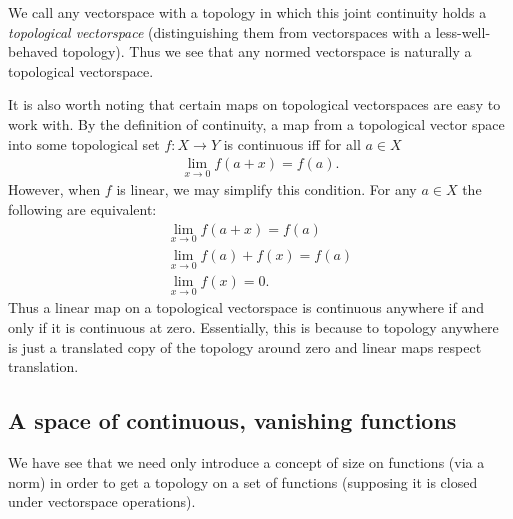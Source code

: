       We call any vectorspace with a topology in which this joint continuity holds a \emph{topological vectorspace} (distinguishing them from vectorspaces with a less-well-behaved topology).
      Thus we see that any normed vectorspace is naturally a topological vectorspace.

      It is also worth noting that certain maps on topological vectorspaces are easy to work with.
      By the definition of continuity, a map from a topological vector space into some topological set $f:X\rightarrow Y$ is continuous iff for all $a\in X$
      \begin{align*}
        \lim_{x\rightarrow 0} f(a+x) = f(a) \text{.}
      \end{align*}
      However, when $f$ is linear, we may simplify this condition.
      For any $a\in X$ the following are equivalent:
      \begin{gather*}
        \lim_{x\rightarrow 0} f(a+x) = f(a) \\
        \lim_{x\rightarrow 0} f(a)+f(x) = f(a) \\
        \lim_{x\rightarrow 0} f(x) = 0\text{.}
      \end{gather*}
      Thus a linear map on a topological vectorspace is continuous anywhere if and only if it is continuous at zero.
      Essentially, this is because to topology anywhere is just a translated copy of the topology around zero and linear maps respect translation.

      \subsection{A space of continuous, vanishing functions}

      We have see that we need only introduce a concept of size on functions (via a norm) in order to get a topology on a set of functions (supposing it is closed under vectorspace operations).

